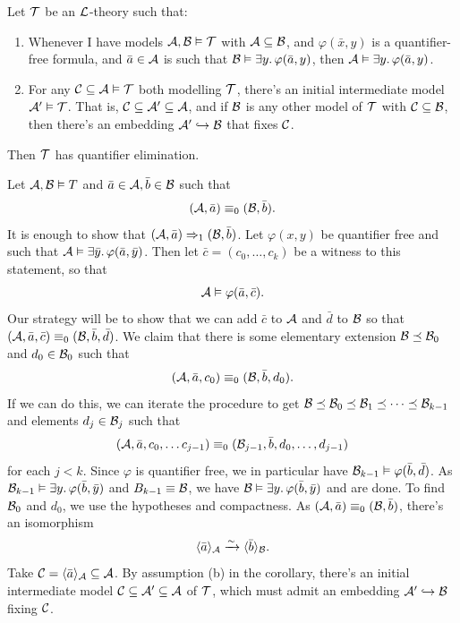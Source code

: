 \documentclass{article}
\numberwithin{thm}{subsection}
\begin{document}
\begin{corr}{}
    Let $\mathcal{T}$ be an $\mathcal{L}$-theory such that:
    \begin{enumerate}
        \item Whenever I have models $\mathcal{A},\mathcal{B} \vDash \mathcal{T}$ with $\mathcal{A} \subseteq \mathcal{B}$, and $\varphi(\bar x, y)$ is a quantifier-free formula, and $\bar a \in \mathcal{A}$ is such that $\mathcal{B} \vDash \exists y.\, \varphi(\bar a, y)$, then $\mathcal{A} \vDash \exists y. \, \varphi(\bar a, y)$.
        \item For any $\mathcal{C} \subseteq \mathcal{A} \vDash \mathcal{T}$ both modelling $\mathcal{T}$, there's an initial intermediate model $\mathcal{A}' \vDash \mathcal{T}$. That is, $\mathcal{C} \subseteq \mathcal{A}' \subseteq \mathcal{A}$, and if $\mathcal{B}$ is any other model of $\mathcal{T}$ with $\mathcal{C} \subseteq \mathcal{B}$, then there's an embedding $\mathcal{A}' \hookrightarrow \mathcal{B}$ that fixes $\mathcal{C}$.
    \end{enumerate}
    Then $\mathcal{T}$ has quantifier elimination.
\end{corr}
\proof \newlec Let $\mathcal{A}, \mathcal{B} \vDash T$ and $\bar a \in \mathcal{A}, \bar b \in \mathcal{B}$ such that \[ (\mathcal{A}, \bar a) \equiv_{0} (\mathcal{B}, \bar b). \] It is enough to show that $(\mathcal{A}, \bar a) \Rightarrow_{1} (\mathcal{B}, \bar b)$. Let $\varphi(x,y)$ be quantifier free and such that $\mathcal{A} \vDash \exists \bar y. \, \varphi(\bar a, \bar y)$. Then let $\bar c = (c_{0}, \dots, c_{k})$ be a witness to this statement, so that \[ \mathcal{A} \vDash \varphi(\bar a, \bar c).\] 
Our strategy will be to show that we can add $\bar c$ to $\mathcal{A}$ and $\bar d$ to $\mathcal{B}$ so that $(\mathcal{A}, \bar a, \bar c) \equiv_{0} (\mathcal{B}, \bar b, \bar d)$. We claim that there is some elementary extension $\mathcal{B} \preceq \mathcal{B}_{0}$ and $d_{0} \in \mathcal{B}_{0}$ such that \[(\mathcal{A}, \bar a, c_{0}) \equiv_{0} (\mathcal{B}, \bar b, d_{0}).\] If we can do this, we can iterate the procedure to get $\mathcal{B} \preceq \mathcal{B}_{0} \preceq \mathcal{B}_{1} \preceq \dots \preceq \mathcal{B}_{k-1}$ and elements $d_{j} \in \mathcal{B}_{j}$ such that \[ (\mathcal{A}, \bar a, c_{0}, \dots c_{j-1}) \equiv_{0} (\mathcal{B}_{j-1}, \bar b, d_{0}, \dots, d_{j-1})\] for each $j<k$. Since $\varphi$ is quantifier free, we in particular have $\mathcal{B}_{k-1} \vDash \varphi(\bar b, \bar d)$. As $\mathcal{B}_{k-1} \vDash \exists y. \, \varphi(\bar b, \bar y)$ and $B_{k-1} \equiv \mathcal{B}$, we have $\mathcal{B} \vDash \exists y. \, \varphi(\bar b, \bar y)$ and are done.
To find $\mathcal{B}_{0}$ and $d_{0}$, we use the hypotheses and compactness. As $(\mathcal{A}, \bar a) \equiv_{0} (\mathcal{B}, \bar b)$, there's an isomorphism \[ \langle \bar a \rangle_{\mathcal{A}} \xrightarrow{\sim} \langle \bar b \rangle_{\mathcal{B}}.\] Take $\mathcal{C}= \langle \bar a \rangle_{\mathcal{A}} \subseteq \mathcal{A}$. By assumption (b) in the corollary, there's an initial intermediate model $\mathcal{C} \subseteq \mathcal{A}' \subseteq \mathcal{A}$ of $\mathcal{T}$, which must admit an embedding $\mathcal{A}' \hookrightarrow \mathcal{B}$ fixing $\mathcal{C}$.
\end{document}
